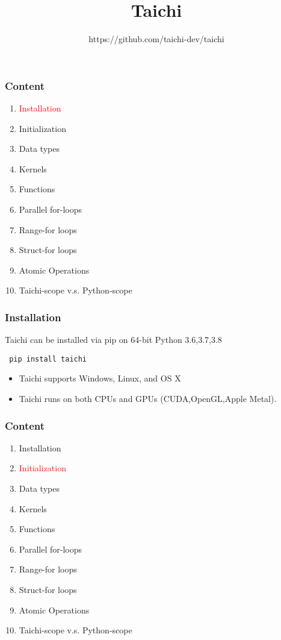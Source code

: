 \documentclass[serif,mathserif]{beamer}
\author[frame work]{https://github.com/taichi-dev/taichi}
\title[taichi\hspace{2em}\insertframenumber/\inserttotalframenumber]{Taichi}
\begin{document}
\begin{CJK}{UTF8}{gbsn}
\maketitle


\begin{frame}
  \frametitle{Content}
  \begin{enumerate}
  \item \textcolor{red}{Installation}
  \item Initialization
  \item Data types
  \item Kernels
  \item Functions
  \item Parallel for-loops
  \item Range-for loops
  \item Struct-for loops
  \item Atomic Operations
  \item Taichi-scope v.s. Python-scope
  \end{enumerate}
\end{frame}

\begin{frame}[fragile]
  \frametitle{Installation}
  Taichi can be installed via pip on 64-bit Python 3.6,3.7,3.8
  \begin{tcolorbox}
\begin{verbatim}
 pip install taichi
\end{verbatim}
  \end{tcolorbox}

  \begin{itemize}
  \item Taichi supports Windows, Linux, and OS X
  \item Taichi runs on both CPUs and GPUs (CUDA,OpenGL,Apple Metal).
  \end{itemize}
\end{frame}

\begin{frame}
  \frametitle{Content}
  \begin{enumerate}
  \item Installation
  \item \textcolor{red}{Initialization}
  \item Data types
  \item Kernels
  \item Functions
  \item Parallel for-loops
  \item Range-for loops
  \item Struct-for loops
  \item Atomic Operations
  \item Taichi-scope v.s. Python-scope
  \end{enumerate}
\end{frame}


\end{CJK}
\end{document}

